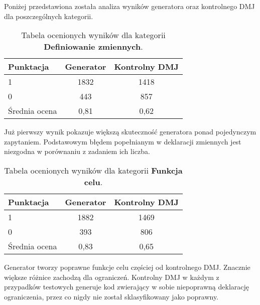 Poniżej przedstawiona została analiza wyników generatora oraz kontrolnego DMJ dla poszczególnych kategorii.

\begin{table}[H]
\caption{Tabela ocenionych wyników dla kategorii \textbf{Definiowanie zmiennych}.}\label{tab:tabela12}
\centering%
\begin{tabular}{|l|c|c|}
\hline
\textbf{Punktacja} & \textbf{Generator} & \textbf{Kontrolny DMJ}\\
\hline
1 & 1832 & 1418 \\
\hline
0 & 443 & 857 \\
\hline
Średnia ocena & 0,81 & 0,62 \\
\hline
\end{tabular}
\end{table}


Już pierwszy wynik pokazuje większą skuteczność generatora ponad pojedynczym zapytaniem. Podstawowym błędem popełnianym w deklaracji zmiennych jest niezgodna w porównaniu z zadaniem ich liczba. %

\begin{table}[H]
\caption{Tabela ocenionych wyników dla kategorii \textbf{Funkcja celu}.}\label{tab:tabela13}
\centering%
\begin{tabular}{|l|c|c|}
\hline
\textbf{Punktacja} & \textbf{Generator} & \textbf{Kontrolny DMJ}\\
\hline
1 & 1882 & 1469 \\
\hline
0 & 393 & 806 \\
\hline
Średnia ocena & 0,83 & 0,65 \\
\hline
\end{tabular}
\end{table}


Generator tworzy poprawne funkcje celu %
częściej od kontrolnego DMJ. 
Znacznie większe różnice zachodzą dla ograniczeń. Kontrolny DMJ w każdym z przypadków testowych generuje kod zwierający w sobie niepoprawną deklarację ograniczenia, przez co nigdy nie został sklasyfikowany jako poprawny. %

